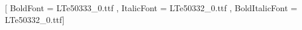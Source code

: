 








\usepackage[utf8]{inputenc}
\usepackage{fontspec}
\setmainfont{LTe50331_0.ttf}[
    BoldFont = LTe50333_0.ttf ,
    ItalicFont = LTe50332_0.ttf ,
    BoldItalicFont = LTe50332_0.ttf]



\usepackage{multicol}
\setlength{\columnsep}{15pt}



\newcommand\boldDoStat[1]{\textcolor{DoStat}{\textbf{#1}}} 
\usepackage{colortbl}


